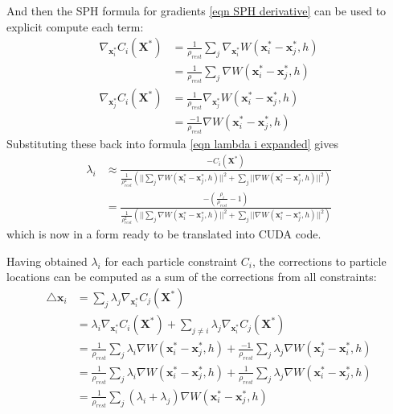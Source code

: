And then the SPH formula for gradients \ref{eqn SPH derivative} can be used to explicit compute each term:
\begin{equation*}
    \begin{aligned}
        \nabla_{\textbf{x}^*_i} C_i(\textbf{X}^*) 
        &= \frac{1}{\rho_{rest}}\sum_j \nabla_{\textbf{x}^*_i} W (\textbf{x}^*_i - \textbf{x}^*_j,h)\\
        &= \frac{1}{\rho_{rest}}\sum_j \nabla W (\textbf{x}^*_i - \textbf{x}^*_j,h)
        \\
        \nabla_{\textbf{x}^*_j} C_i(\textbf{X}^*) 
        &= \frac{1}{\rho_{rest}}\nabla_{\textbf{x}^*_j} W (\textbf{x}^*_i - \textbf{x}^*_j,h)\\
        &= \frac{-1}{\rho_{rest}}\nabla W (\textbf{x}^*_i - \textbf{x}^*_j,h)
    \end{aligned}
\end{equation*}
Substituting these back into formula \ref{eqn lambda i expanded} gives
\begin{equation}
    \label{eqn lambda i final}
    \begin{aligned}
        \lambda_i  &\approx\frac{-C_i(\textbf{X}^*)}{ 
            \frac{1}{\rho_{rest}^2} (||\sum_j \nabla W (\textbf{x}^*_i - \textbf{x}^*_j,h)||^2 + \sum_j ||\nabla W (\textbf{x}^*_i - \textbf{x}^*_j,h)||^2)
        }\\
        &=\frac{-(\frac{\rho_i}{\rho_{rest}}-1)}{ 
            \frac{1}{\rho_{rest}^2} (||\sum_j \nabla W (\textbf{x}^*_i - \textbf{x}^*_j,h)||^2 + \sum_j ||\nabla W (\textbf{x}^*_i - \textbf{x}^*_j,h)||^2)
        }
    \end{aligned}
\end{equation}
which is now in a form ready to be translated into CUDA code.

Having obtained $\lambda_i$ for each particle constraint $C_i$, the corrections to particle locations can be computed as a sum of the corrections from all constraints:
\begin{equation}
    \label{eqn PBF delta x}
    \begin{aligned}
        \triangle \textbf{x}_i 
        &= \sum_{j} \lambda_j \nabla_{\textbf{x}^*_i} C_j(\textbf{X}^*)
        \\
        &= \lambda_i \nabla_{\textbf{x}^*_i} C_i(\textbf{X}^*) + \sum_{j\neq i} \lambda_j \nabla_{\textbf{x}^*_i} C_j(\textbf{X}^*)
        \\
        &= \frac{1}{\rho_{rest}} \sum_{j} \lambda_i 
        \nabla W (\textbf{x}^*_i - \textbf{x}^*_j,h)
        + 
        \frac{-1}{\rho_{rest}} \sum_{j} \lambda_j
        \nabla W (\textbf{x}^*_j - \textbf{x}^*_i,h)\\
        &= \frac{1}{\rho_{rest}} \sum_{j} \lambda_i 
        \nabla W (\textbf{x}^*_i - \textbf{x}^*_j,h)
        + 
        \frac{1}{\rho_{rest}} \sum_{j} \lambda_j
        \nabla W (\textbf{x}^*_i - \textbf{x}^*_j,h)\\
        &= \frac{1}{\rho_{rest}} \sum_{j} (\lambda_i + \lambda_j)
        \nabla W (\textbf{x}^*_i - \textbf{x}^*_j,h)
    \end{aligned}
\end{equation}


